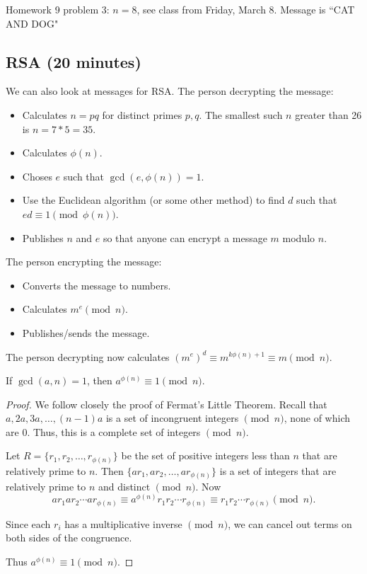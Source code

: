\documentclass[letterpaper, 11 pt]{article}
\begin{document}
Homework 9 problem 3: $n=8$, see class from Friday, March 8. Message is ``CAT AND DOG"
\subsection{RSA (20 minutes)}
We can also look at messages for RSA. The person decrypting the message:
\begin{itemize}
 \item Calculates $n=pq$ for distinct primes $p, q$. The smallest such $n$ greater than 26 is $n=7*5=35$.                                                                                                                                                                                                                                                                                                   
\item Calculates $\phi(n)$.
\item Choses $e$ such that $\gcd(e, \phi(n))=1$. 
\item Use the Euclidean algorithm (or some other method) to find $d$ such that $ed\equiv 1 \pmod {\phi(n)}$.
\item Publishes $n$ and $e$ so that anyone can encrypt a message $m$ modulo $n$.
\end{itemize}
The person encrypting the message:
\begin{itemize}
 \item Converts the message to numbers.
 \item Calculates $m^e \pmod n$.
 \item Publishes/sends the message.
\end{itemize}
The person decrypting now calculates $(m^e)^d\equiv m^{k\phi(n)+1}\equiv m \pmod n$.

\begin{thm}[Theorem 5.3]
 If $\gcd(a,n)=1$, then $a^{\phi(n)}\equiv 1 \pmod n$.
\end{thm}
\begin{proof}
 We follow closely the proof of Fermat's Little Theorem. Recall that $a,2a,3a,\dots, (n-1)a$ is a set of incongruent integers $\pmod n$, none of which are $0$. Thus, this is a complete set of integers $\pmod n$. 
 
 Let $R=\{r_1,r_2,\dots,r_{\phi(n)}\}$ be the set of positive integers less than $n$ that are relatively prime to $n$. Then $\{ar_1,ar_2,\dots,ar_{\phi(n)}\}$ is a set of integers that are relatively prime to $n$ and distinct $\pmod n$. Now 
 \[ar_1ar_2\cdots ar_{\phi(n)}\equiv a^{\phi(n)}r_1r_2\cdots r_{\phi(n)}\equiv r_1r_2\cdots r_{\phi(n)} \pmod n.\]
 
 Since each $r_i$ has a multiplicative inverse $\pmod n$, we can cancel out terms on both sides of the congruence.
 
 Thus $a^{\phi(n)}\equiv 1 \pmod n$.
\end{proof}
\end{document}
